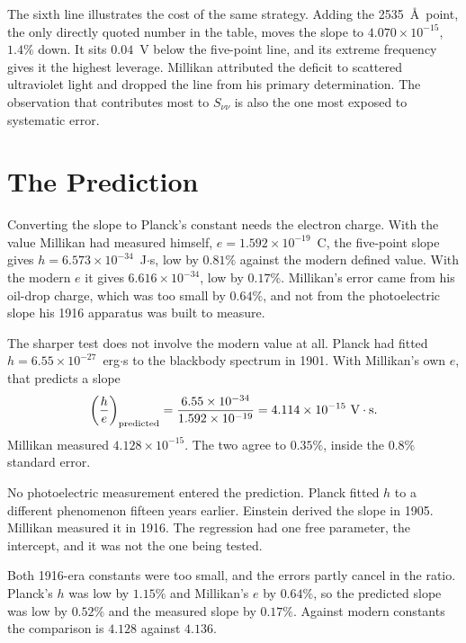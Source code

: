 \documentclass[11pt]{article}
\begin{document}
The sixth line illustrates the cost of the same strategy.  Adding the
2535~\AA\ point, the only directly quoted number in the table, moves the slope
to $4.070\times10^{-15}$, $1.4\%$ down.  It sits $0.04$~V below the five-point
line, and its extreme frequency gives it the highest leverage.  Millikan
attributed the deficit to scattered ultraviolet light and dropped the line
from his primary determination.  The observation that contributes most to
$S_{\nu\nu}$ is also the one most exposed to systematic error.

\section{The Prediction}

Converting the slope to Planck's constant needs the electron charge.  With the
value Millikan had measured himself, $e = 1.592\times10^{-19}$~C, the
five-point slope gives $h = 6.573\times10^{-34}$~J$\cdot$s, low by $0.81\%$
against the modern defined value.  With the modern $e$ it gives
$6.616\times10^{-34}$, low by $0.17\%$.  Millikan's error came from his
oil-drop charge, which was too small by $0.64\%$, and not from the
photoelectric slope his 1916 apparatus was built to measure.

The sharper test does not involve the modern value at all.  Planck had fitted
$h = 6.55\times10^{-27}$~erg$\cdot$s to the blackbody spectrum in 1901.  With
Millikan's own $e$, that predicts a slope
\begin{equation}\label{eq:pred}
  \left(\frac{h}{e}\right)_{\rm predicted}
  = \frac{6.55\times10^{-34}}{1.592\times10^{-19}}
  = 4.114\times10^{-15}~\text{V}\cdot\text{s}.
\end{equation}
Millikan measured $4.128\times10^{-15}$.  The two agree to $0.35\%$, inside
the $0.8\%$ standard error.

No photoelectric measurement entered the prediction.  Planck fitted $h$ to a
different phenomenon fifteen years earlier.  Einstein derived the slope in
1905.  Millikan measured it in 1916.  The regression had one free parameter,
the intercept, and it was not the one being tested.

Both 1916-era constants were too small, and the errors partly cancel in the
ratio.  Planck's $h$ was low by $1.15\%$ and Millikan's $e$ by $0.64\%$, so
the predicted slope was low by $0.52\%$ and the measured slope by $0.17\%$.
Against modern constants the comparison is $4.128$ against $4.136$.
\end{document}
